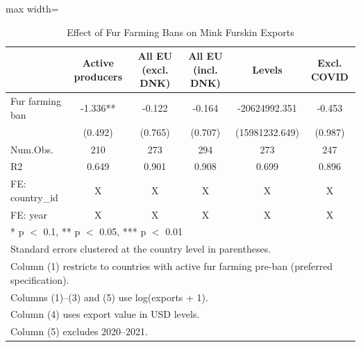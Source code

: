 \begin{table}
\centering
\caption{Effect of Fur Farming Bans on Mink Furskin Exports}
\label{tab:main}
\centering
\begin{adjustbox}{max width=\textwidth}
\begin{tabular}[t]{lccccc}
\toprule
  & Active producers & All EU (excl. DNK) & All EU (incl. DNK) & Levels & Excl. COVID\\
\midrule
Fur farming ban & -1.336** & -0.122 & -0.164 & -20624992.351 & -0.453\\
 & (0.492) & (0.765) & (0.707) & (15981232.649) & (0.987)\\
\midrule
Num.Obs. & 210 & 273 & 294 & 273 & 247\\
R2 & 0.649 & 0.901 & 0.908 & 0.699 & 0.896\\
FE: country\_id & X & X & X & X & X\\
FE: year & X & X & X & X & X\\
\bottomrule
\multicolumn{6}{l}{\rule{0pt}{1em}* p $<$ 0.1, ** p $<$ 0.05, *** p $<$ 0.01}\\
\multicolumn{6}{l}{\rule{0pt}{1em}Standard errors clustered at the country level in parentheses.}\\
\multicolumn{6}{l}{\rule{0pt}{1em}Column (1) restricts to countries with active fur farming pre-ban (preferred specification).}\\
\multicolumn{6}{l}{\rule{0pt}{1em}Columns (1)--(3) and (5) use log(exports + 1).}\\
\multicolumn{6}{l}{\rule{0pt}{1em}Column (4) uses export value in USD levels.}\\
\multicolumn{6}{l}{\rule{0pt}{1em}Column (5) excludes 2020--2021.}\\
\end{tabular}
\end{adjustbox}
\end{table}
